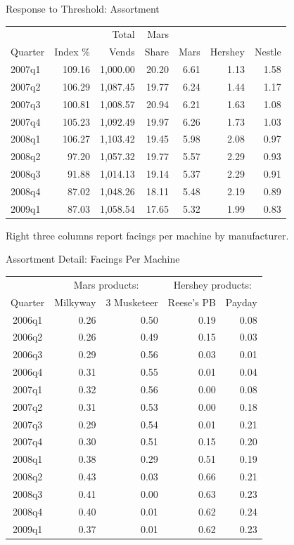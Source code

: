 \documentclass[aspectratio=169,11pt]{beamer}
\begin{document}
\begin{frame}{Response to Threshold: Assortment}
\small
\begin{center}
\begin{tabular}{|l | rrr | rrr|} \toprule
 & & Total & Mars  & &  &  \\ 
Quarter &   Index \% & Vends & Share & Mars & Hershey & Nestle \\ \midrule
2007q1 & 109.16 & 1,000.00 & 20.20 & 6.61 & 1.13 & 1.58 \\
2007q2 & 106.29 & 1,087.45 & 19.77 & 6.24 & 1.44 & 1.17 \\
2007q3 & 100.81 & 1,008.57 & 20.94 & 6.21 & 1.63 & 1.08 \\
2007q4 & 105.23 & 1,092.49 & 19.97 & 6.26 & 1.73 & 1.03 \\ \midrule
2008q1 & 106.27 & 1,103.42 & 19.45 & 5.98 & 2.08 & 0.97 \\   \midrule
2008q2 & 97.20 & 1,057.32 & 19.77 & 5.57 & 2.29 & 0.93 \\ 
2008q3 & 91.88 & 1,014.13 & 19.14 & 5.37 & 2.29 & 0.91 \\
2008q4 & 87.02 & 1,048.26 & 18.11 & 5.48 & 2.19 & 0.89 \\
2009q1 & 87.03 & 1,058.54 & 17.65 & 5.32 & 1.99 & 0.83 \\ 
\bottomrule
\end{tabular}
\end{center}

Right three columns report facings per machine by manufacturer.
\end{frame}

\begin{frame}{Assortment Detail: Facings Per Machine}
\footnotesize
\begin{center}
\begin{tabular}{|c | r r r r|}\midrule
&\multicolumn{2}{c}{Mars products:}&\multicolumn{2}{c|}{Hershey products:}\\
Quarter &  Milkyway &  3 Musketeer & Reese's PB & Payday \\
\toprule
2006q1 & 0.26 & 0.50 & 0.19 & 0.08 \\
2006q2 & 0.26 & 0.49 & 0.15 & 0.03 \\
2006q3 & 0.29 & 0.56 & 0.03 & 0.01 \\
2006q4 & 0.31 & 0.55 & 0.01 & 0.04 \\
2007q1 & 0.32 & 0.56 & 0.00 & 0.08 \\
2007q2 & 0.31 & 0.53 & 0.00 & 0.18 \\
2007q3 & 0.29 & 0.54 & 0.01 & 0.21 \\
2007q4 & 0.30 & 0.51 & 0.15 & 0.20 \\ \midrule
2008q1 & 0.38 & 0.29 & 0.51 & 0.19 \\  \midrule
2008q2 & 0.43 & 0.03 & 0.66 & 0.21 \\ 
2008q3 & 0.41 & 0.00 & 0.63 & 0.23 \\
2008q4 & 0.40 & 0.01 & 0.62 & 0.24 \\
2009q1 & 0.37 & 0.01 & 0.62 & 0.23 \\ \bottomrule
\end{tabular}
\end{center}
\end{frame}
\end{document}
